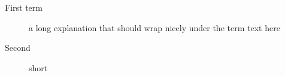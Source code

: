 \begin{description}
\item[First term] a long explanation that should wrap nicely under the term text here
\item[Second] short
\end{description}
